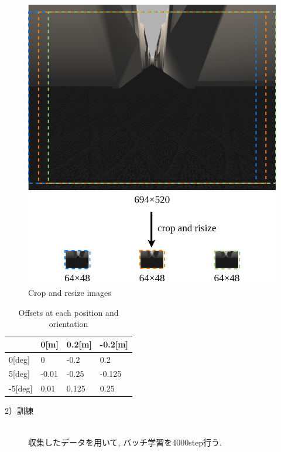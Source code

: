 \begin{figure}[h]
  \centering
  \includegraphics[keepaspectratio, scale=0.35]{images/crop.png}
  \caption{Crop and resize images}
  \label{Fig:crop}
\end{figure}

\begin{table}[h]
  \centering
  \caption{Offsets at each position and orientation}
  \begin{tabular}{|p{2cm}|p{2cm}|p{2cm}|p{2cm}|} \hline
      & 0[m] & 0.2[m] & -0.2[m] \\ \hline
    0[deg] & 0 & -0.2 & 0.2 \\ \hline
    5[deg] & -0.01 & -0.25 & -0.125 \\ \hline
    -5[deg] & 0.01 & 0.125 & 0.25 \\ \hline
  \end{tabular}
  \label{tb:offset}
\end{table}

\begin{description}
  \item[2）訓練]\mbox{}\\ \hspace*{3mm}収集したデータを用いて, バッチ学習を4000step行う. 
\end{description}

